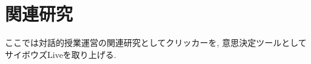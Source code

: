 \documentclass{funthesis}
\begin{document}








\chapter{関連研究}
ここでは対話的授業運営の関連研究としてクリッカーを, 意思決定ツールとしてサイボウズLiveを取り上げる.
\end{document}
